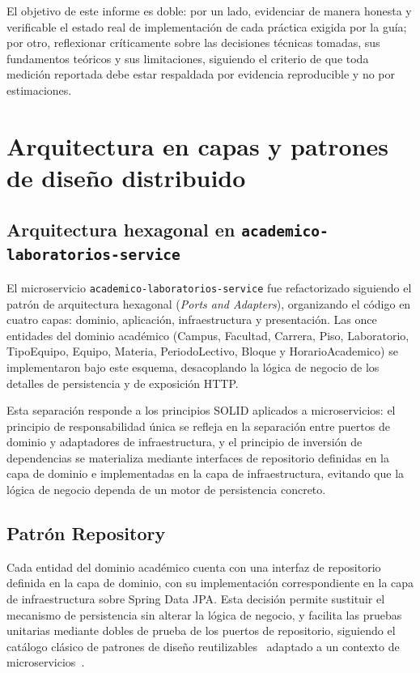 \documentclass[11pt,a4paper]{article}
\begin{document}
El objetivo de este informe es doble: por un lado, evidenciar de
manera honesta y verificable el estado real de implementación de cada
práctica exigida por la guía; por otro, reflexionar críticamente sobre
las decisiones técnicas tomadas, sus fundamentos teóricos y sus
limitaciones, siguiendo el criterio de que toda medición reportada
debe estar respaldada por evidencia reproducible y no por
estimaciones.

\section{Arquitectura en capas y patrones de diseño distribuido}
\label{sec:arquitectura}

\subsection{Arquitectura hexagonal en \texttt{academico-laboratorios-service}}

El microservicio \texttt{academico-laboratorios-service} fue refactorizado
siguiendo el patrón de arquitectura hexagonal (\emph{Ports and Adapters}),
organizando el código en cuatro capas: dominio, aplicación,
infraestructura y presentación. Las once entidades del dominio académico
(Campus, Facultad, Carrera, Piso, Laboratorio, TipoEquipo, Equipo,
Materia, PeriodoLectivo, Bloque y HorarioAcademico) se implementaron bajo
este esquema, desacoplando la lógica de negocio de los detalles de
persistencia y de exposición HTTP.

Esta separación responde a los principios SOLID aplicados a
microservicios: el principio de responsabilidad única se refleja en la
separación entre puertos de dominio y adaptadores de infraestructura, y
el principio de inversión de dependencias se materializa mediante
interfaces de repositorio definidas en la capa de dominio e implementadas
en la capa de infraestructura, evitando que la lógica de negocio dependa
de un motor de persistencia concreto.

\subsection{Patrón Repository}

Cada entidad del dominio académico cuenta con una interfaz de repositorio
definida en la capa de dominio, con su implementación correspondiente en
la capa de infraestructura sobre Spring Data JPA. Esta decisión permite
sustituir el mecanismo de persistencia sin alterar la lógica de negocio,
y facilita las pruebas unitarias mediante dobles de prueba de los
puertos de repositorio, siguiendo el catálogo clásico de patrones de
diseño reutilizables~\cite{gamma1994design} adaptado a un contexto de
microservicios~\cite{richardson2018microservices}.
\end{document}
